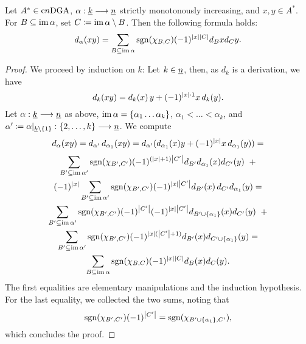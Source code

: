 %
%
\begin{lem}\label{lem_higher_leibniz_rel}
Let $A^* \in \mathrm{c}n\mathrm{DGA}$, $\alpha:\underline{k} \longrightarrow \underline{n}$ strictly monotonously increasing, and $x,y \in A^*$. For $B \subseteq \operatorname{im} \alpha$, set $C \coloneqq \operatorname{im} \alpha \setminus B$. Then the following formula holds:%
    \[ d_\alpha (xy) = \sum_{B \subseteq \operatorname{im} \alpha} \operatorname{sgn}( \chi_{B,C} ) (-1)^{\left\vert x\right\vert\left\vert C\right\vert} d_B x d_C y. \]
\begin{proof}
We proceed by induction on $k$: Let $k \in \underline{n}$, then, as $d_k$ is a derivation, we have
\[ d_k(xy) = d_k(x) \, y + (-1)^{\left\vert x\right\vert \cdot 1} x \, d_k(y). \]
Let $\alpha: \underline{k} \longrightarrow \underline{n}$ as above, $\operatorname{im} \alpha = \{ \alpha_1 \ldots \alpha_k \}$, $\alpha_1 \less \ldots \less \alpha_k$, and $\alpha^\prime \coloneqq \alpha|_{\underline{k} \setminus \{1\}}:\{2,\ldots,k\} \longrightarrow \underline{n}$. We compute
\begin{gather*}
  d_\alpha (xy) = d_{\alpha^\prime}\,d_{\alpha_1}(xy) =%
    d_{\alpha^\prime}( d_{\alpha_1}(x) y + (-1)^{\abs{x}} x \, d_{\alpha_1}(y) ) =\\[.3em]
  \sum_{B^\prime \subseteq \im \alpha^\prime} \sgn(\chi_{B^\prime,C^\prime}) %
    (-1)^{ (\abs{x}+1) \abs{C^\prime} } d_{B^\prime} d_{\alpha_1}(x)d_{C^\prime}(y) \;\; + \\%
  (-1)^{\abs{x}} \sum_{B^\prime \subseteq \im \alpha^\prime}%
    \sgn(\chi_{B^\prime,C^\prime}) (-1)^{ \abs{x} \abs{C^\prime} } %
    d_{B^\prime}(x) \, d_{C^\prime}d_{\alpha_1}(y) = \\ %
  \sum_{B^\prime \subseteq \im \alpha^\prime} \sgn(\chi_{B^\prime,C^\prime}) %
    (-1)^{\abs{C^\prime}}(-1)^{ \abs{x} \abs{C^\prime} } %
    d_{B^\prime \cup \{\alpha_1\} }(x) d_{C^\prime}(y) \;\; + \\%
  \sum_{B^\prime \subseteq \im \alpha^\prime} \sgn(\chi_{B^\prime,C^\prime}) %
    (-1)^{\abs{x}(\abs{C^\prime}+1)} %
    d_{B^\prime}(x) d_{C^\prime \cup \{\alpha_1\}}(y) = \\%
  \sum_{B \subseteq \im \alpha} \sgn( \chi_{B,C} ) (-1)^{\abs{x}\abs{C}} d_B (x) d_C (y).
\end{gather*}
The first equalities are elementary manipulations and the induction hypothesis. For the last equality, we collected the two sums, noting that %
  \begin{displaymath}
    \sgn(\chi_{B^\prime,C^\prime})(-1)^{\abs{C^\prime}} = %
      \sgn(\chi_{B^\prime \cup \{\alpha_1\},C^\prime}),
  \end{displaymath}
  which concludes the proof.
\end{proof}
\end{lem}
